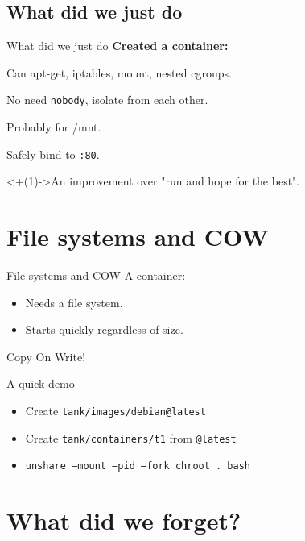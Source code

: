 \documentclass[14pt]{beamer}
\begin{document}
\subsection{What did we just do}
\begin{frame}{What did we just do}
    \relax
    {\bf Created a container:}
    \begin{description}[<+(1)->]
        \item[Fake root] Can apt-get, iptables, mount, nested cgroups.
        \item[Isolated pids] No need {\tt nobody}, isolate from each other.
        \item[Isolated mounts] Probably for /mnt.
        \item[Isolated network] Safely bind to {\tt :80}.
    \end{description}
    \onslide<+(1)->{An improvement over "run and hope for the best".}
\end{frame}

\section{File systems and COW}
\begin{frame}{File systems and COW}
    A container:
    \begin{itemize}[<+->]
        \item Needs a file system.
        \item Starts quickly regardless of size.
    \end{itemize}
    \pause
    Copy On Write!
\end{frame}

\begin{frame}{A quick demo}
    \small
    \begin{itemize}
        \item Create {\tt tank/images/debian@latest}
        \item Create {\tt tank/containers/t1} from {\tt @latest}
        \item {\tt unshare --mount --pid --fork chroot . bash}
    \end{itemize}
\end{frame}

\section{What did we forget?}
\end{document}
